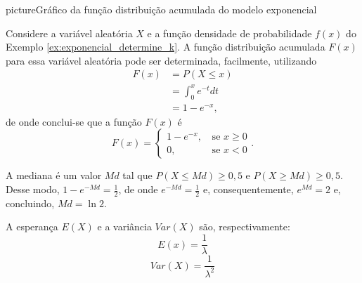 \begin{sidepicture}{0cm}{picture}{Gráfico da função distribuição acumulada do modelo exponencial}
	\label{fig:cap0:modelo_exponencial_acumulada}
\end{sidepicture}

\begin{example}
	Considere a variável aleatória $X$ e a função densidade de probabilidade $f(x)$ do Exemplo \ref{ex:exponencial_determine_k}. A função distribuição acumulada $F(x)$ para essa variável aleatória pode ser determinada, facilmente, utilizando
	\begin{align*}
		F(x)&=P(X\leqslant x)\\
			&=\int_{0}^{x}e^{-t}dt\\
			&=1-e^{-x}\text{,}
	\end{align*}
	de onde conclui-se que a função $F(x)$ é
	\[
		F(x)=\begin{cases}
			1-e^{-x}\text{,}&\text{ se } x \geqslant 0\\
			0\text{,}&\text{ se } x < 0
		\end{cases}
		\text{.}
	\]
	
	A mediana é um valor $Md$ tal que $P(X\leqslant Md)\geqslant 0,5$ e $P(X\geqslant Md)\geqslant 0,5$. Desse modo, $1-e^{-Md}=\frac{1}{2}$, de onde $e^{-Md}=\frac{1}{2}$ e, consequentemente, $e^{Md}=2$ e, concluindo, $Md=\ln 2$.
\end{example}

A esperança $E(X)$ e a variância $Var(X)$ são, respectivamente:
\begin{equation}
	E(x)=\frac{1}{\lambda}
\end{equation}
\begin{equation}
	Var(X)=\frac{1}{\lambda^2}
\end{equation}

